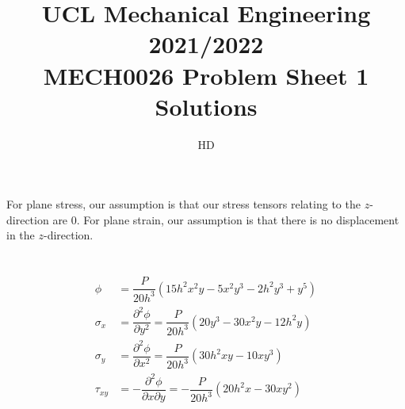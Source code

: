 \documentclass[11pt]{article}
\numberwithin{equation}{section}
\begin{document}
\title{\textbf{UCL Mechanical Engineering 2021/2022}\\MECH0026 Problem Sheet 1 Solutions}
\author{HD}
\maketitle
\section{}
\subsection{}
For plane stress, our assumption is that our stress tensors relating to the $z$-direction are 0. For plane strain, our assumption is that there is no displacement in the $z$-direction.
\section{}
\begin{align}
    \phi      & = \dfrac{P}{20h^3} \left(15h^2x^2y-5x^2y^3-2h^2y^3+y^5\right)                                    \\
    \sigma_x  & = \dfrac{\partial^2 \phi}{\partial y^2} = \dfrac{P}{20h^3}\left(20y^3 -30x^2y-12h^2y\right)      \\
    \sigma_y  & = \dfrac{\partial^2 \phi}{\partial x^2} = \dfrac{P}{20h^3}\left(30h^2xy-10xy^3\right)            \\
    \tau_{xy} & = -\dfrac{\partial^2 \phi}{\partial x\partial y} = - \dfrac{P}{20h^3} \left(20h^2x-30xy^2\right)
\end{align}
\end{document}

